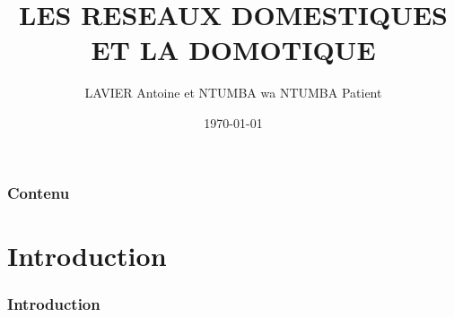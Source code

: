 \documentclass[handout]{beamer}
\begin{document}
\title{LES RESEAUX DOMESTIQUES ET LA DOMOTIQUE}  
\author{LAVIER Antoine et NTUMBA wa NTUMBA Patient}
\date{\today} 

\begin{frame}
\titlepage
\end{frame} 

\begin{frame}
\frametitle{Contenu}
\tableofcontents
\end{frame} 


\section{Introduction} 
\begin{frame}\frametitle{Introduction} 
\end{frame}
\end{document}
